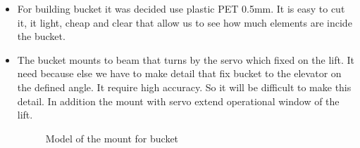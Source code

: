\begin{itemize}
\item For building bucket it was decided use plastic PET 0.5mm. It is easy to cut it, it light, cheap and clear that allow us to see how much elements are incide the bucket.
\item The bucket mounts to beam that turns by the servo which fixed on the lift. It need because else we have to make detail that fix bucket to the elevator on the defined angle. It require high accuracy. So it will be difficult to make this detail. In addition the mount with servo extend operational window of the lift. 
\begin{figure}[H]
	\begin{minipage}[h]{\linewidth}
		\caption{Model of the mount for bucket}
	\end{minipage}
\end{figure}


\end{itemize}
